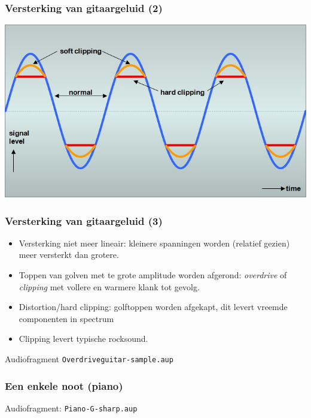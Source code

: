 \documentclass[compress, darktitle, framenumber, totalframenumber]{beamer}
\begin{document}
\begin{frame}
\frametitle{Versterking van gitaargeluid (2)}
\includegraphics[width=\textwidth]{images/clipping.png}
\end{frame}

\begin{frame}
\frametitle{Versterking van gitaargeluid (3)}
\begin{itemize}
\item Versterking niet meer lineair: kleinere spanningen worden (relatief gezien) meer versterkt dan grotere.
\item Toppen van golven met te grote amplitude worden afgerond: \textit{overdrive} of \textit{clipping} met vollere en warmere klank tot gevolg. 
\item Distortion/hard clipping: golftoppen worden afgekapt, dit levert vreemde componenten in spectrum
\item Clipping levert typische rocksound.
\end{itemize}
\begin{block}{Audiofragment}
\texttt{Overdriveguitar-sample.aup}
\end{block}
\end{frame}

\begin{frame}
\frametitle{Een enkele noot (piano)}
\begin{block}{Audiofragment:}
\texttt{Piano-G-sharp.aup} 
\end{block}
\pause
{}
\end{frame}
\end{document}
